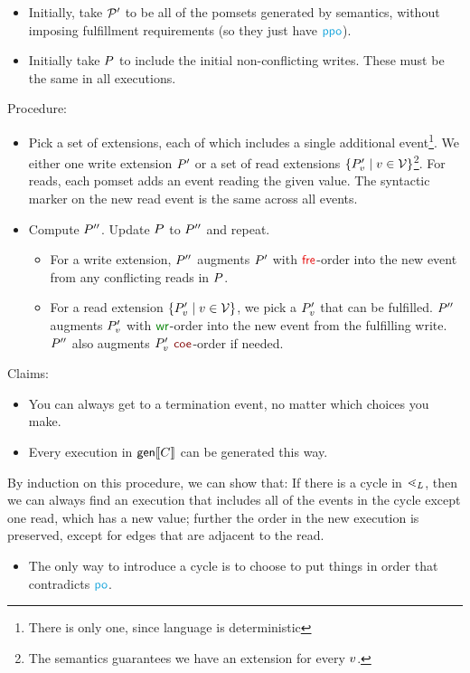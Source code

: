   \begin{itemize}
  \item Initially, take $\mathcal{P}'$ to be all of the pomsets generated by
    semantics, without imposing fulfillment requirements (so they just have
    $\rppo$).    
  \item Initially take $P$ to include the initial non-conflicting writes.
    These must be the same in all executions.
  \end{itemize}
  Procedure:
  \begin{itemize}
  \item Pick a set of extensions, each of which includes a single additional
    event\footnote{There is only one, since language is deterministic}.  We
    either one write extension $P'$ or a set of read extensions
    $\{P'_v\mid v\in\mathcal{V}\}$\footnote{The semantics guarantees we have
      an extension for every $v$.}.  For reads, each pomset adds an event
    reading the given value.  The syntactic marker on the new read event is
    the same across all events.
  \item Compute $P''$. Update $P$ to $P''$ and repeat.
    \begin{itemize}
    \item For a write extension, $P''$ augments $P'$ with $\rfre$-order
      into the new event from any conflicting reads in $P$.
    \item For a read extension $\{P'_v\mid v\in\mathcal{V}\}$, we pick a
      $P'_v$ that can be fulfilled.  $P''$ augments $P'_v$
      with $\rrfe$-order into the new event from the fulfilling write.
      $P''$ also augments $P'_v$ $\rcoe$-order if needed.
    \end{itemize}
  \end{itemize}
  Claims:
  \begin{itemize}
  \item You can always get to a termination event, no matter which choices
    you make.
  \item Every execution in $\textsf{gen}\llbracket C\rrbracket$ can be generated this way.
  \end{itemize}

  By induction on this procedure, we can show that: If there is a cycle in
  $\lessdot_{L}$, then we can always find an execution that includes all of the
  events in the cycle except one read, which has a new value; further the
  order in the new execution is preserved, except for edges that are adjacent
  to the read.
  \begin{itemize}
  \item The only way to introduce a cycle is to choose to put things in order
    that contradicts $\rpox$. 
  \end{itemize}
  





